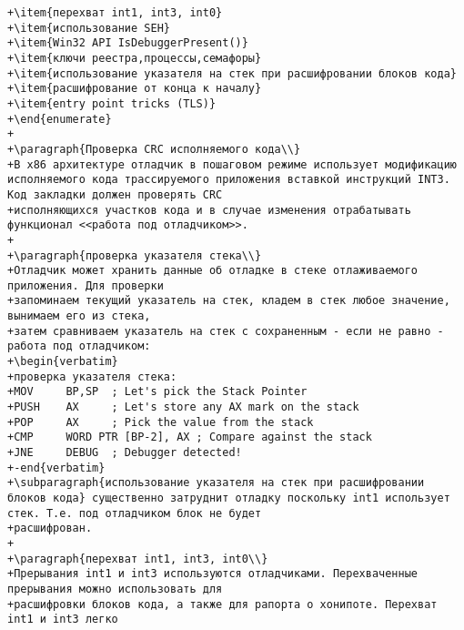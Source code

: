 \begin{verbatim}
+\item{перехват int1, int3, int0}
+\item{использование SEH}
+\item{Win32 API IsDebuggerPresent()}
+\item{ключи реестра,процессы,семафоры}
+\item{использование указателя на стек при расшифровании блоков кода}
+\item{расшифрование от конца к началу}
+\item{entry point tricks (TLS)}
+\end{enumerate}
+
+\paragraph{Проверка CRC исполняемого кода\\}
+В x86 архитектуре отладчик в пошаговом режиме использует модификацию исполняемого кода трассируемого приложения вставкой инструкций INT3. Код закладки должен проверять CRC
+исполняющихся участков кода и в случае изменения отрабатывать функционал <<работа под отладчиком>>.
+
+\paragraph{проверка указателя стека\\}
+Отладчик может хранить данные об отладке в стеке отлаживаемого приложения. Для проверки
+запоминаем текущий указатель на стек, кладем в стек любое значение, вынимаем его из стека,
+затем сравниваем указатель на стек с сохраненным - если не равно - работа под отладчиком:
+\begin{verbatim}
+проверка указателя стека:
+MOV     BP,SP  ; Let's pick the Stack Pointer
+PUSH    AX     ; Let's store any AX mark on the stack
+POP     AX     ; Pick the value from the stack
+CMP     WORD PTR [BP-2], AX ; Compare against the stack
+JNE     DEBUG  ; Debugger detected!
+-end{verbatim}
+\subparagraph{использование указателя на стек при расшифровании блоков кода} существенно затруднит отладку поскольку int1 использует стек. Т.е. под отладчиком блок не будет
+расшифрован.
+
+\paragraph{перехват int1, int3, int0\\}
+Прерывания int1 и int3 используются отладчиками. Перехваченные прерывания можно использовать для
+расшифровки блоков кода, а также для рапорта о хонипоте. Перехват int1 и int3 легко

\end{verbatim}
